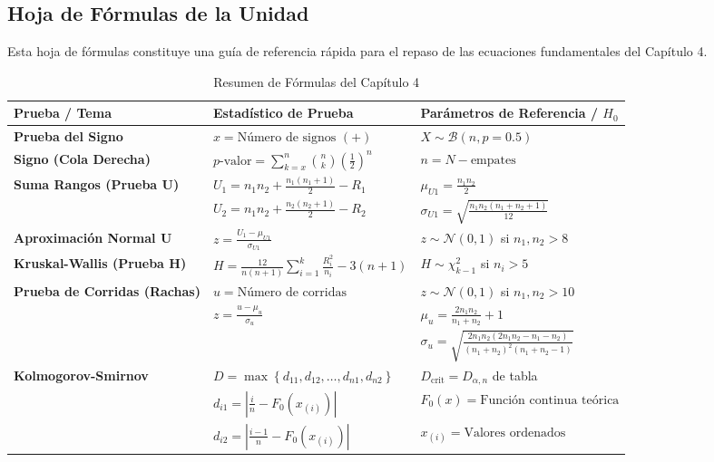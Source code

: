 \documentclass[11pt,a4paper]{article}
\begin{document}
\newpage
\begin{landscape}
\section{Hoja de Fórmulas de la Unidad}

Esta hoja de fórmulas constituye una guía de referencia rápida para el repaso de las ecuaciones fundamentales del Capítulo 4.
\begin{table}[h!]
\centering
\caption{Resumen de Fórmulas del Capítulo 4}
\label{tab:hoja_formulas}
\begin{tabularx}{\linewidth}{>{\raggedright\arraybackslash}p{3.2cm} X X}
\toprule
\textbf{Prueba / Tema} & \textbf{Estadístico de Prueba} & \textbf{Parámetros de Referencia / $H_0$} \\
\midrule
\textbf{Prueba del Signo} & $x = \text{Número de signos } (+)$ & $X \sim \mathcal{B}(n, p=0.5)$ \\
\textbf{Signo (Cola Derecha)} & $p\text{-valor} = \sum_{k=x}^{n} \binom{n}{k} \left(\frac{1}{2}\right)^n$ & $n = N - \text{empates}$ \\
\textbf{Suma Rangos (Prueba U)} & $U_1 = n_1 n_2 + \frac{n_1(n_1+1)}{2} - R_1$ & $\mu_{U1} = \frac{n_1 n_2}{2}$ \\
 & $U_2 = n_1 n_2 + \frac{n_2(n_2+1)}{2} - R_2$ & $\sigma_{U1} = \sqrt{\frac{n_1 n_2 (n_1+n_2+1)}{12}}$ \\
\textbf{Aproximación Normal U} & $z = \frac{U_1 - \mu_{U1}}{\sigma_{U1}}$ & $z \sim \mathcal{N}(0, 1)$ si $n_1, n_2 > 8$ \\
\textbf{Kruskal-Wallis (Prueba H)} & $H = \frac{12}{n(n+1)} \sum_{i=1}^{k} \frac{R_i^2}{n_i} - 3(n+1)$ & $H \sim \chi^2_{k-1}$ si $n_i > 5$ \\
\textbf{Prueba de Corridas (Rachas)} & $u = \text{Número de corridas}$ & $z \sim \mathcal{N}(0, 1)$ si $n_1, n_2 > 10$ \\
 & $z = \frac{u - \mu_u}{\sigma_u}$ & $\mu_u = \frac{2 n_1 n_2}{n_1 + n_2} + 1$ \\
 & & $\sigma_u = \sqrt{\frac{2 n_1 n_2 (2 n_1 n_2 - n_1 - n_2)}{(n_1+n_2)^2 (n_1+n_2-1)}}$ \\
\textbf{Kolmogorov-Smirnov} & $D = \max \left\{ d_{11}, d_{12}, \dots, d_{n1}, d_{n2} \right\}$ & $D_{\text{crit}} = D_{\alpha, n}$ de tabla \\
 & $d_{i1} = \left| \frac{i}{n} - F_0(x_{(i)}) \right|$ & $F_0(x) = \text{Función continua teórica}$ \\
 & $d_{i2} = \left| \frac{i-1}{n} - F_0(x_{(i)}) \right|$ & $x_{(i)} = \text{Valores ordenados}$ \\
\bottomrule
\end{tabularx}
\end{table}
\end{landscape}
\end{document}

